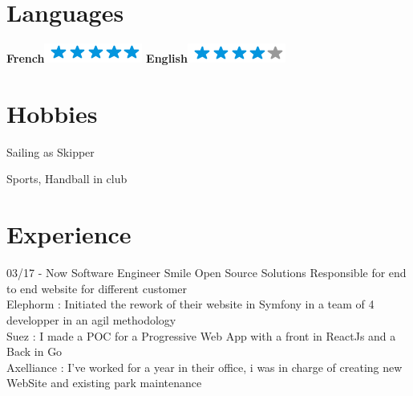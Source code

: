 \documentclass{friggeri-cv}
\begin{document}
\begin{aside}
	\section{Languages}
	\textbf{French}\includegraphics[scale=0.40]{img/5stars.png}
	\textbf{English}\includegraphics[scale=0.40]{img/4stars.png}
	~
	\section{Hobbies}
\item Sailing as Skipper
\item Sports, Handball in club
\end{aside}

\section{Experience}
\begin{entrylist}
	\entry
	{03/17 - Now}
	{Software Engineer}
	{Smile Open Source Solutions}
	{
		Responsible for end to end website for different customer \\
	 	Elephorm : Initiated the rework of their website in Symfony in a team of 4 developper in an agil methodology \\
		Suez : I made a POC for a Progressive Web App with a front in ReactJs and a Back in Go \\
		Axelliance : I've worked for a year in their office, i was in charge of creating new WebSite and existing park maintenance \\
	}
\end{entrylist}
\end{document}
